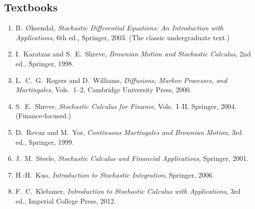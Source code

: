 \subsection*{Textbooks}
\begin{enumerate}
    \item B.\ \O{}ksendal, \textit{Stochastic Differential Equations: An Introduction with Applications}, 6th ed., Springer, 2003. (The classic undergraduate text.)
    \item I.\ Karatzas and S.\ E.\ Shreve, \textit{Brownian Motion and Stochastic Calculus}, 2nd ed., Springer, 1998.
    \item L.\ C.\ G.\ Rogers and D.\ Williams, \textit{Diffusions, Markov Processes, and Martingales}, Vols.\ 1--2, Cambridge University Press, 2000.
    \item S.\ E.\ Shreve, \textit{Stochastic Calculus for Finance}, Vols.\ I--II, Springer, 2004. (Finance-focused.)
    \item D.\ Revuz and M.\ Yor, \textit{Continuous Martingales and Brownian Motion}, 3rd ed., Springer, 1999.
    \item J.\ M.\ Steele, \textit{Stochastic Calculus and Financial Applications}, Springer, 2001.
    \item H.-H.\ Kuo, \textit{Introduction to Stochastic Integration}, Springer, 2006.
    \item F.\ C.\ Klebaner, \textit{Introduction to Stochastic Calculus with Applications}, 3rd ed., Imperial College Press, 2012.
\end{enumerate}

